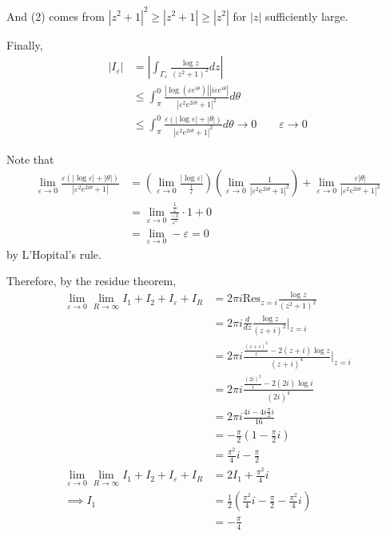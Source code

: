 \documentclass[12pt]{Homework}
\newcommand{\res}{\text{Res}}
\begin{document}
\begin{solution}
And (2) comes from $|z^2+1|^2\ge |z^2+1|\ge |z^2|$ for $|z|$ sufficiently large.

Finally, \begin{align*}
    |I_\varepsilon|&=\left|\int_{\Gamma_\varepsilon}\frac{\log z}{(z^2+1)^2}dz\right|\\
    &\le\int_\pi^0\frac{|\log(\varepsilon e^{i\theta})||i\varepsilon e^{i\theta}|}{|\varepsilon^2e^{2i\theta}+1|^2}d\theta\\
    &\le\int_\pi^0\frac{\varepsilon(|\log \varepsilon|+|\theta|)}{|\varepsilon^2e^{2i\theta}+1|^2}d\theta\to0\qquad\varepsilon\to0
\end{align*}

Note that \begin{align*}
    \lim_{\varepsilon\to0}\frac{\varepsilon(|\log \varepsilon|+|\theta|)}{|\varepsilon^2e^{2i\theta}+1|}&=\left(\lim_{\varepsilon\to0}\frac{|\log \varepsilon|}{\frac{1}{\varepsilon}}\right)\left(\lim_{\varepsilon\to0}\frac{1}{|\varepsilon^2e^{2i\theta}+1|^2}\right)+\lim_{\varepsilon\to0}\frac{\varepsilon|\theta|}{|\varepsilon^2e^{2i\theta}+1|^2}\\
    &=\lim_{\varepsilon\to0}\frac{\frac{1}{\varepsilon}}{\frac{-1}{\varepsilon^2}}\cdot1+0\\
    &=\lim_{\varepsilon\to0}-\varepsilon=0
\end{align*} by L'Hopital's rule.

Therefore, by the residue theorem, \begin{align*}
    \lim_{\varepsilon\to0}\lim_{R\to\infty}I_1+I_2+I_\varepsilon+I_R&=2\pi i\res_{z=i}\frac{\log z}{(z^2+1)^2}\\
    &=2\pi i\frac{d}{dz}\frac{\log z}{(z+i)^2}\Big|_{z=i}\\
    &=2\pi i\frac{\frac{(z+i)^2}{z}-2(z+i)\log z}{(z+i)^4}\Big|_{z=i}\\
    &=2\pi i\frac{\frac{(2i)^2}{i}-2(2i)\log i}{(2i)^4}\\
    &=2\pi i\frac{4i-4i\frac{\pi}{2}i}{16}\\
    &=-\frac{\pi}{2}\left(1-\frac{\pi}{2}i\right)\\
    &=\frac{\pi^2}{4}i-\frac{\pi}{2}\\
    \lim_{\varepsilon\to0}\lim_{R\to\infty}I_1+I_2+I_\varepsilon+I_R&=2I_1+\frac{\pi^2}{4}i\\
    \implies I_1&=\frac{1}{2}\left(\frac{\pi^2}{4}i-\frac{\pi}{2}-\frac{\pi^2}{4}i\right)\\
    &=-\frac{\pi}{4}
\end{align*}
\end{solution}
\newpage
\end{document}
